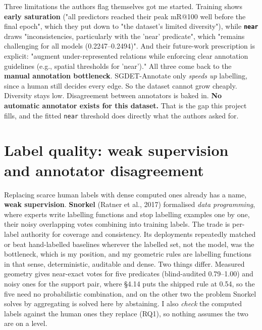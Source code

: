 Three limitations the authors flag themselves got me started. Training shows \textbf{early saturation} ("all predictors reached their peak mR@100 well before the final epoch", which they put down to "the dataset's limited diversity"), while \textbf{\texttt{near}} draws "inconsistencies, particularly with the 'near' predicate", which "remains challenging for all models (0.2247--0.2494)". And their future-work prescription is explicit: "augment under-represented relations while enforcing clear annotation guidelines (e.g., spatial thresholds for 'near')." All three come back to the \textbf{manual annotation bottleneck}. SGDET-Annotate only \textit{speeds up} labelling, since a human still decides every edge. So the dataset cannot grow cheaply. Diversity stays low. Disagreement between annotators is baked in. \textbf{No automatic annotator exists for this dataset.} That is the gap this project fills, and the fitted \texttt{near} threshold does directly what the authors asked for.

\section{Label quality: weak supervision and annotator disagreement}

Replacing scarce human labels with dense computed ones already has a name, \textbf{weak supervision}. \textbf{Snorkel} (Ratner et al., 2017) formalised \textit{data programming}, where experts write labelling functions and stop labelling examples one by one, their noisy overlapping votes combining into training labels. The trade is per-label authority for coverage and consistency. Its deployments repeatedly matched or beat hand-labelled baselines wherever the labelled set, not the model, was the bottleneck, which is my position, and my geometric rules are labelling functions in that sense, deterministic, auditable and dense. Two things differ. Measured geometry gives near-exact votes for five predicates (blind-audited 0.79--1.00) and noisy ones for the support pair, where \S{}4.14 puts the shipped rule at 0.54, so the five need no probabilistic combination, and on the other two the problem Snorkel solves by aggregating is solved here by abstaining. I also \textit{check} the computed labels against the human ones they replace (RQ1), so nothing assumes the two are on a level.

